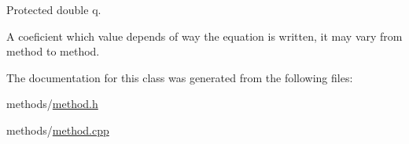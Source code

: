 Protected double q. 

A coeficient which value depends of way the equation is written, it may vary from method to method. 

The documentation for this class was generated from the following files\+:\begin{DoxyCompactItemize}
\item 
methods/\hyperlink{method_8h}{method.\+h}\item 
methods/\hyperlink{method_8cpp}{method.\+cpp}\end{DoxyCompactItemize}
